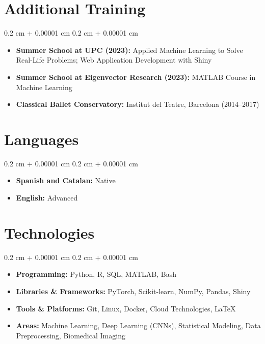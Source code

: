 \documentclass[10pt, letterpaper]{article}
\newenvironment{highlightsforbulletentries}{
    \begin{itemize}[
        topsep=0.10 cm,
        parsep=0.10 cm,
        partopsep=0pt,
        itemsep=0pt,
        leftmargin=10pt
    ]
}{
    \end{itemize}
} %
\newenvironment{onecolentry}{
    \begin{adjustwidth}{
        0.2 cm + 0.00001 cm
    }{
        0.2 cm + 0.00001 cm
    }
}{
    \end{adjustwidth}
} %
\begin{document}
    \section{Additional Training}

        \begin{onecolentry}
            \begin{highlightsforbulletentries}
                \item \textbf{Summer School at UPC (2023):} Applied Machine Learning to Solve Real-Life Problems; Web Application Development with Shiny
                \item \textbf{Summer School at Eigenvector Research (2023):} MATLAB Course in Machine Learning
                \item \textbf{Classical Ballet Conservatory:} Institut del Teatre, Barcelona (2014--2017)
            \end{highlightsforbulletentries}
        \end{onecolentry}


    \section{Languages}

        \begin{onecolentry}
            \begin{highlightsforbulletentries}
                \item \textbf{Spanish and Catalan:} Native
                \item \textbf{English:} Advanced
            \end{highlightsforbulletentries}
        \end{onecolentry}


    \section{Technologies}

        \begin{onecolentry}
            \begin{highlightsforbulletentries}
                \item \textbf{Programming:} Python, R, SQL, MATLAB, Bash
                \item \textbf{Libraries \& Frameworks:} PyTorch, Scikit-learn, NumPy, Pandas, Shiny
                \item \textbf{Tools \& Platforms:} Git, Linux, Docker, Cloud Technologies, \LaTeX
                \item \textbf{Areas:} Machine Learning, Deep Learning (CNNs), Statistical Modeling, Data Preprocessing, Biomedical Imaging
            \end{highlightsforbulletentries}
        \end{onecolentry}
\end{document}
